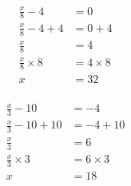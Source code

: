 \documentclass[12pt]{article}
\newcounter{minipagecount}
\begin{document}
\begin{multicols}{2}
\begin{minipage}[t]{0.45\textwidth}
\begin{align*}
        \frac{x}{8} - 4 &= 0\\
        \frac{x}{8} - 4 + 4 &= 0 + 4\\
        \frac{x}{8} &= 4\\
        \frac{x}{8} \times8 &= 4 \times8\\
        x &= 32\\
    \end{align*}
\end{minipage} %
\noindent{(\theminipagecount)}\hspace{0.1mm} %
\begin{minipage}[t]{0.45\textwidth} %
    \vspace{-26pt}  %
    \raggedright %
    \begin{align*} %
        \frac{x}{3} - 10 &= -4\\
        \frac{x}{3} - 10 + 10 &= -4 + 10\\
        \frac{x}{3} &= 6\\
        \frac{x}{3} \times3 &= 6 \times3\\
        x &= 18\\
    \end{align*}
\end{minipage}\columnbreak
\noindent{(\theminipagecount)}\hspace{0.1mm} %
\begin{minipage}[t]{0.45\textwidth} %
    \vspace{-26pt}  %
    \raggedright %

\end{minipage}
\end{multicols}
\end{document}
